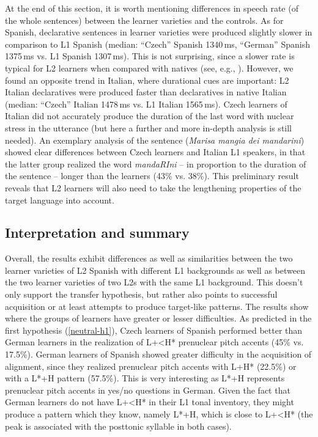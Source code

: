 At the end of this section, it is worth mentioning differences in speech rate (of the whole sentences) between the learner varieties and the controls. As for Spanish, declarative sentences in learner varieties were produced slightly slower in comparison to L1 Spanish (median: “Czech”  Spanish 1340\,ms, “German” Spanish 1375\,ms vs. L1 Spanish 1307\,ms). This is not surprising, since a slower rate is typical for L2 learners when compared with natives (see, e.g., \citealt{DerwingMunro1997, DerwingEtAl2004}). However, we found an opposite trend in Italian, where durational cues are important: L2 Italian declaratives were produced faster than declaratives in native Italian (median: “Czech” Italian 1478\,ms vs. L1 Italian 1565\,ms). Czech learners of Italian did not accurately produce the duration of the last word with nuclear stress in the utterance (but here a further and more in-depth analysis is still needed). An exemplary analysis of the sentence (\textit{Marisa mangia dei mandarini}) showed clear differences between Czech learners and Italian L1 speakers, in that the latter group realized the word \textit{mandaRIni} -- in proportion to the duration of the sentence -- longer than the learners (43\% vs. 38\%). This preliminary result reveals that L2 learners will also need to take the lengthening properties of the target language into account.


\subsection{Interpretation and summary}\label{sec:4.1.5}

Overall, the results exhibit differences as well as similarities between the two learner varieties of L2 Spanish with different L1 backgrounds as well as between the two learner varieties of two L2s with the same L1 background. This doesn't only support the transfer hypothesis, but rather also points to successful acquisition or at least attempts to produce target-like patterns. The results show where the groups of learners have greater or lesser difficulties. As predicted in the first hypothesis (\ref{neutral-h1}), Czech learners of Spanish performed better than German learners in the realization of L+<H* prenuclear pitch accents (45\% vs. 17.5\%). German learners of Spanish showed greater difficulty in the acquisition of alignment, since they realized prenuclear pitch accents with L+H* (22.5\%) or with a L*+H pattern (57.5\%). This is very interesting as L*+H represents prenuclear pitch accents in yes/no questions in German. Given the fact that German learners do not have L+<H* in their L1 tonal inventory, they might produce a pattern which they know, namely L*+H, which is close to L+<H* (the peak is associated with the posttonic syllable in both cases).


